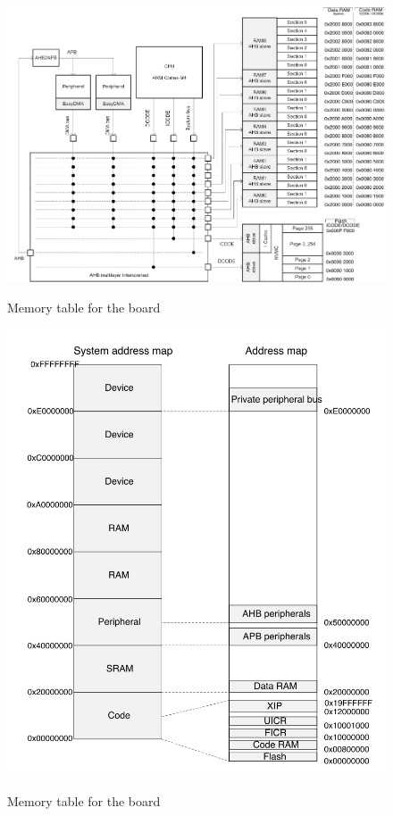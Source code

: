 \documentclass{Configuration_Files/PoliMi3i_thesis}
\begin{document}
\begin{figure}[H]
    \includegraphics[scale=0.3]{memNRF.png}
    \centering
    \label{mem_table_1}
    \caption{Memory table for the board \cite{NordicSemiconductorInfocenter}}
    \end{figure}

\begin{figure}[H]
\includegraphics[scale=0.4]{memory2.png}
\centering
\label{mem_table_2}
\caption{Memory table for the board \cite{NordicSemiconductorInfocenter}}
\end{figure}
\end{document}

